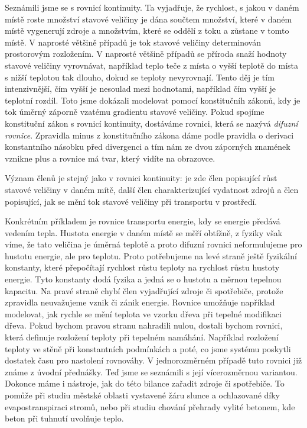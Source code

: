 \documentclass[12pt]{article}
\begin{document}
Seznámili jsme se s rovnicí kontinuity. Ta vyjadřuje, že rychlost, s jakou v daném místě roste množství stavové veličiny je dána součtem množství, které v daném místě vygenerují zdroje a množstvím, které se oddělí z toku a zůstane v tomto místě. 
V naprosté většině případů je tok stavové veličiny determinován prostorovým rozložením. V naprosté většině případů se příroda snaží hodnoty stavové veličiny vyrovnávat, například teplo teče z místa o vyšší teplotě do místa s nižší teplotou tak dlouho, dokud se teploty nevyrovnají. Tento děj je tím intenzivnější, čím vyšší je nesoulad mezi hodnotami, například čím vyšší je teplotní rozdíl. Toto jsme dokázali modelovat pomocí konstitučníh zákonů, kdy je tok úměrný záporně vzatému gradientu stavové veličiny. Pokud spojíme konstituční zákon s rovnicí kontinuity, dostáváme rovnici, která se nazývá \textit{difuzní rovnice}. Zpravidla minus z konstitučního zákona dáme podle pravidla o derivaci konstantního násobku před divergenci a tím nám ze dvou záporných znamének vznikne plus a rovnice má tvar, který vidíte na obrazovce.

Význam členů je stejný jako v rovnici kontinuity: je zde člen popisující růst stavové veličiny v daném mítě, další člen charakterizující vydatnost zdrojů a člen popisující, jak se mění tok stavové veličiny při transportu v prostředí.

Konkrétním příkladem je rovnice transportu energie, kdy se energie předává vedením tepla. Hustota energie v daném místě se měří obtížně, z fyziky však víme, že tato veličina je úměrná teplotě a proto difuzní rovnici neformulujeme pro hustotu energie, ale pro teplotu. Proto potřebujeme na levé straně ještě fyzikální konstanty, které přepočítají rychlost růstu teploty na rychlost růstu hustoty energie. Tyto konstanty dodá fyzika a jedná se o hustotu a měrnou tepelnou kapacitu. Na pravé straně chybí člen vyjadřující zdroje či spotřebiče, protože zpravidla neuvažujeme vznik či zánik energie. Rovnice umožňuje například modelovat, jak rychle se mění teplota ve vzorku dřeva při tepelné modifikaci dřeva. Pokud bychom pravou stranu nahradili nulou, dostali bychom rovnici, která definuje rozložení teploty při tepelném namáhání. Například rozložení teploty ve stěně při konstantních podmínkách a poté, co jsme systému poskytli dostatek času pro nastolení rovnováhy. V jednorozměrném případě tuto rovnici již známe z úvodní přednášky. Teď jsme se seznámili s její vícerozměrnou variantou. Dokonce máme i nástroje, jak do této bilance zařadit zdroje či spotřebiče. To pomůže při studiu městské oblasti vystavené žáru slunce a ochlazované díky evapostranspiraci stromů, nebo při studiu chování přehrady vylité betonem, kde beton při tuhnutí uvolňuje teplo.
\end{document}
